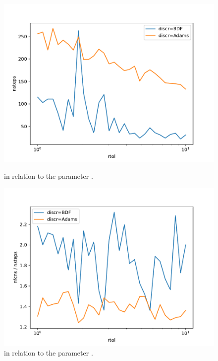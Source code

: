 \documentclass{scrartcl}
\begin{document}
\begin{figure}[h]
\centering
\begin{minipage}[b]{0.45\textwidth}
\centering
\includegraphics[width=\textwidth]{../Plots/Task4/Figure_300}
\caption{ in relation to the parameter .}
\label{pl:nsteps2}
\end{minipage}
\hfill
\begin{minipage}[b]{0.45\textwidth}
\centering
\includegraphics[width=\textwidth]{../Plots/Task4/Figure_310}
\caption{ in relation to the parameter .}
\label{pl:nfcns_nsteps2}
\end{minipage}
\end{figure}
\end{document}
